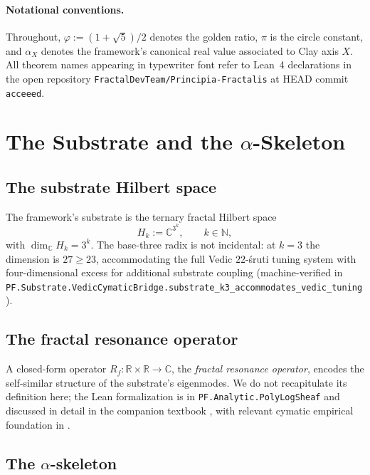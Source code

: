 \documentclass[11pt,a4paper]{article}
\theoremstyle{definition}
\begin{document}
\paragraph{Notational conventions.} Throughout, $\varphi := (1 +
\sqrt{5})/2$ denotes the golden ratio, $\pi$ is the circle constant,
and $\alpha_X$ denotes the framework's canonical real value
associated to Clay axis $X$. All theorem names appearing in
typewriter font refer to Lean~4 declarations in the open repository
\texttt{FractalDevTeam/Principia-Fractalis} at HEAD commit
\texttt{acceeed}.

\section{The Substrate and the \texorpdfstring{$\alpha$}{alpha}-Skeleton}
\label{sec:substrate}

\subsection{The substrate Hilbert space}

The framework's substrate is the ternary fractal Hilbert space
\begin{equation}
\label{eq:substrate}
H_k := \mathbb{C}^{3^k}, \qquad k \in \mathbb{N},
\end{equation}
with $\dim_\mathbb{C} H_k = 3^k$. The base-three radix is not
incidental: at $k = 3$ the dimension is $27 \geq 23$, accommodating
the full Vedic $22$-\'sruti tuning system \cite{bharatamuninatyashastra}
with four-dimensional excess for additional substrate coupling
(machine-verified in
\texttt{PF.Substrate.VedicCymaticBridge.substrate\_k3\_accommodates\_vedic\_tuning}).

\subsection{The fractal resonance operator}

A closed-form operator $R_f : \mathbb{R} \times \mathbb{R} \to
\mathbb{C}$, the \emph{fractal resonance operator}, encodes the
self-similar structure of the substrate's eigenmodes. We do not
recapitulate its definition here; the Lean formalization is in
\texttt{PF.Analytic.PolyLogSheaf} and discussed in detail in the
companion textbook \cite{cohen2026textbook}, with relevant cymatic
empirical foundation in \cite{chladni1787,jenny1967cymatics}.

\subsection{The \texorpdfstring{$\alpha$}{alpha}-skeleton}
\end{document}
